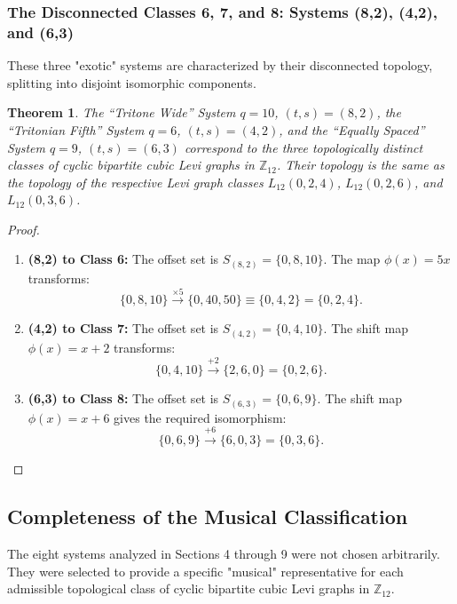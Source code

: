 \documentclass[12pt,letterpaper]{amsart}
\newtheorem{theorem}{Theorem}
\begin{document}
\subsubsection{The Disconnected Classes 6, 7, and 8: Systems (8,2), (4,2), and (6,3)}

These three "exotic" systems are characterized by their disconnected topology, splitting into disjoint isomorphic components.

\begin{theorem}
The ``Tritone Wide'' System $q=10$, $(t,s)=(8,2)$, the ``Tritonian Fifth'' System $q=6$, $(t,s)=(4,2)$, and the ``Equally Spaced'' System $q=9$, $(t,s)=(6,3)$ correspond to the three topologically distinct classes of cyclic bipartite cubic Levi graphs in $\mathbb{Z}_{12}$. Their topology is the same as the topology of the respective Levi graph classes $L_{12}(0,2,4)$, $L_{12}(0,2,6)$, and $L_{12}(0,3,6)$.
\end{theorem}

\begin{proof}\phantom{}\\
\begin{enumerate}
    \item \textbf{(8,2) to Class 6:} The offset set is $S_{(8,2)} = \{0, 8, 10\}$. The map $\phi(x) = 5x$ transforms:
    \[ \{0, 8, 10\} \xrightarrow{\times 5} \{0, 40, 50\} \equiv \{0, 4, 2\} = \{0, 2, 4\}. \]
    \item \textbf{(4,2) to Class 7:} The offset set is $S_{(4,2)} = \{0, 4, 10\}$. The shift map $\phi(x) = x+2$ transforms:
    \[ \{0, 4, 10\} \xrightarrow{+2} \{2, 6, 0\} = \{0, 2, 6\}. \]
    \item \textbf{(6,3) to Class 8:} The offset set is $S_{(6,3)} = \{0, 6, 9\}$. The shift map $\phi(x) = x+6$ gives the required isomorphism:
    \[ \{0, 6, 9\} \xrightarrow{+6} \{6, 0, 3\} = \{0, 3, 6\}. \]
\end{enumerate}
\end{proof}

\subsection{Completeness of the Musical Classification}

The eight systems analyzed in Sections 4 through 9 were not chosen arbitrarily. They were selected to provide a specific "musical" representative for each admissible topological class of cyclic bipartite cubic Levi graphs in $\mathbb{Z}_{12}$.
\end{document}

